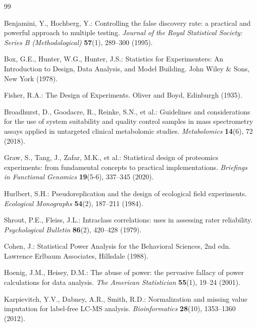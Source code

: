 \documentclass[11pt,twoside,openright]{book}
\begin{document}
\begin{thebibliography}{99}
\small

Benjamini, Y., Hochberg, Y.: Controlling the false discovery rate: a practical and powerful approach to multiple testing.
\textit{Journal of the Royal Statistical Society: Series B (Methodological)} \textbf{57}(1), 289--300 (1995).

Box, G.E., Hunter, W.G., Hunter, J.S.: Statistics for Experimenters: An Introduction to Design, Data Analysis, and Model Building.
John Wiley \& Sons, New York (1978).

Fisher, R.A.: The Design of Experiments.
Oliver and Boyd, Edinburgh (1935).

Broadhurst, D., Goodacre, R., Reinke, S.N., et al.: Guidelines and considerations for the use of system suitability and quality control samples in mass spectrometry assays applied in untargeted clinical metabolomic studies.
\textit{Metabolomics} \textbf{14}(6), 72 (2018).

Graw, S., Tang, J., Zafar, M.K., et al.: Statistical design of proteomics experiments: from fundamental concepts to practical implementations.
\textit{Briefings in Functional Genomics} \textbf{19}(5-6), 337--345 (2020).

Hurlbert, S.H.: Pseudoreplication and the design of ecological field experiments.
\textit{Ecological Monographs} \textbf{54}(2), 187--211 (1984).

Shrout, P.E., Fleiss, J.L.: Intraclass correlations: uses in assessing rater reliability.
\textit{Psychological Bulletin} \textbf{86}(2), 420--428 (1979).

Cohen, J.: Statistical Power Analysis for the Behavioral Sciences, 2nd edn.
Lawrence Erlbaum Associates, Hillsdale (1988).

Hoenig, J.M., Heisey, D.M.: The abuse of power: the pervasive fallacy of power calculations for data analysis.
\textit{The American Statistician} \textbf{55}(1), 19--24 (2001).

Karpievitch, Y.V., Dabney, A.R., Smith, R.D.: Normalization and missing value imputation for label-free LC-MS analysis.
\textit{Bioinformatics} \textbf{28}(10), 1353--1360 (2012).


\end{thebibliography}
\end{document}
